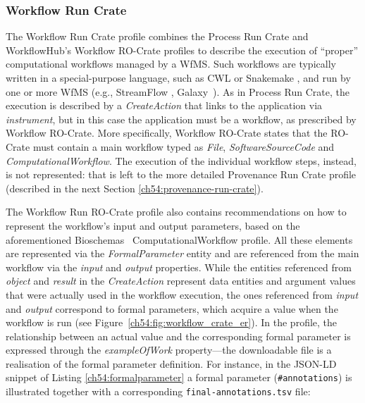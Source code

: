 \subsubsection{Workflow Run Crate}\label{ch54:workflow-run-crate}

The Workflow Run Crate profile \cite{WRROC 2023b} combines the Process Run Crate and WorkflowHub's Workflow RO-Crate \cite{Bacall 2022} profiles to describe the execution of “proper” computational workflows managed by a \acrshort{WfMS}.
Such workflows are typically written in a special-purpose language, such as \acrshort{CWL} or Snakemake
\cite{Köster 2012}, and run by one or more WfMS (e.g., StreamFlow \cite{Colonnelli 2021}, Galaxy~\cite{Galaxy 2022}).
As in Process Run Crate, the execution is described by a \emph{CreateAction}
that links to the application via \emph{instrument}, but in this case the application must be a workflow, as prescribed by Workflow RO-Crate.
More specifically, Workflow RO-Crate states that the RO-Crate must contain a main workflow typed as \emph{File}, \emph{SoftwareSourceCode}
and \emph{ComputationalWorkflow}.
The execution of the individual workflow steps, instead, is not represented: that is left to the more detailed Provenance Run Crate profile (described in the next Section \vref{ch54:provenance-run-crate}).

The Workflow Run RO-Crate profile also contains recommendations on how to represent the workflow's input and output parameters, based on the aforementioned Bioschemas~\cite{Gray 2017} ComputationalWorkflow profile.
All these elements are represented via the \emph{FormalParameter} entity and are referenced from the main workflow via the \emph{input} and
\emph{output} properties.
While the entities referenced from
\emph{object} and \emph{result} in the \emph{CreateAction} represent data entities and argument values that were actually used in the workflow execution, the ones referenced from \emph{input} and
\emph{output} correspond to formal parameters, which acquire a value when the workflow is run (see Figure~\vref{ch54:fig:workflow_crate_er}).
In the profile, the relationship between an actual value and the corresponding formal parameter is expressed through the \emph{exampleOfWork} property---the downloadable file is a realisation of the formal parameter definition.
For instance, in the JSON-LD snippet of Listing \vref{ch54:formalparameter} a formal parameter (\texttt{\#annotations}) is illustrated together with a corresponding \texttt{final-annotations.tsv} file:

